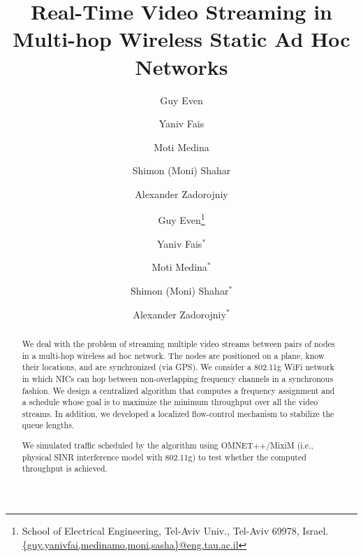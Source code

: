 \documentclass[12pt]{article}
\newenvironment{proof sketch}[1]{\noindent {\emph{Proof sketch of #1:}}}{\hfill \qed}
\begin{document}
\title{Real-Time Video Streaming in Multi-hop Wireless Static Ad Hoc Networks}

\ifnum{}
\author{%
Guy Even
\and
Yaniv Fais
\and
Moti Medina
%
\and Shimon (Moni) Shahar
\and Alexander Zadorojniy}

\fi

\ifnum{}
\author{%
Guy Even\thanks{School of Electrical Engineering,
Tel-Aviv Univ., Tel-Aviv 69978, Israel.
\protect\url{{guy,yanivfai,medinamo,moni,sasha}@eng.tau.ac.il}}
\and
Yaniv Fais$^*$
\and
Moti Medina$^*$
%
\and Shimon (Moni) Shahar$^*$
\and Alexander Zadorojniy$^*$ }
\fi

\date{}

\maketitle



\begin{abstract}
  We deal with the problem of streaming multiple video streams between
  pairs of nodes in a multi-hop wireless ad hoc network.  The nodes
  are positioned on a plane, know their locations, and are
  synchronized (via GPS). We consider a 802.11g WiFi network in which
  NICs can hop between non-overlapping frequency channels in a
  synchronous fashion. We design a centralized algorithm that computes
  a frequency assignment and a schedule whose goal is to maximize the
  minimum throughput over all the video streams.  In addition, we
  developed a localized flow-control mechanism to stabilize the queue
  lengths.

  We simulated traffic scheduled by the algorithm using OMNET++/MixiM
  (i.e., physical SINR interference model with 802.11g) to test
  whether the computed throughput is achieved.
\end{abstract}

\end{document}
